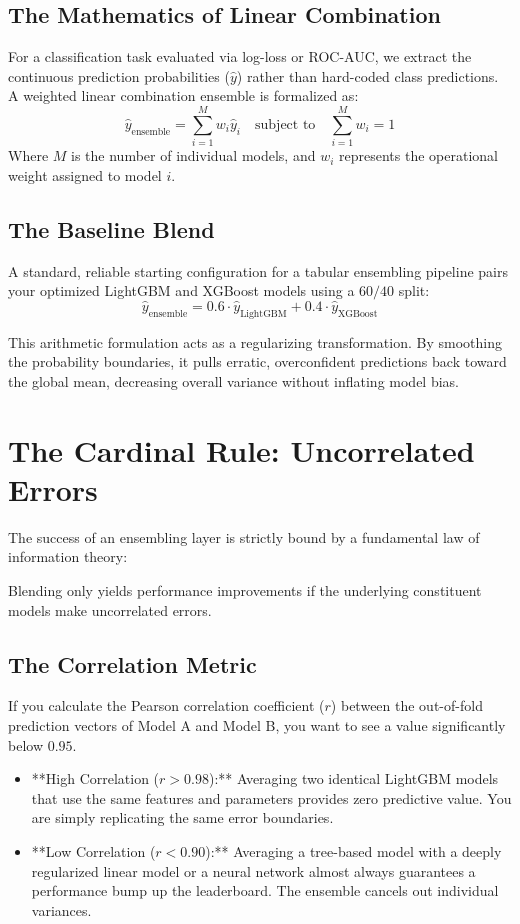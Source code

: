 \documentclass{article}
\begin{document}
\subsection{The Mathematics of Linear Combination}
For a classification task evaluated via log-loss or ROC-AUC, we extract the continuous prediction probabilities ($\hat{y}$) rather than hard-coded class predictions. A weighted linear combination ensemble is formalized as:
\begin{equation}
    \hat{y}_{\text{ensemble}} = \sum_{i=1}^{M} w_i \hat{y}_i \quad \text{subject to} \quad \sum_{i=1}^{M} w_i = 1
\end{equation}
Where $M$ is the number of individual models, and $w_i$ represents the operational weight assigned to model $i$.

\subsection{The Baseline Blend}
A standard, reliable starting configuration for a tabular ensembling pipeline pairs your optimized LightGBM and XGBoost models using a $60/40$ split:
$$\hat{y}_{\text{ensemble}} = 0.6 \cdot \hat{y}_{\text{LightGBM}} + 0.4 \cdot \hat{y}_{\text{XGBoost}}$$

This arithmetic formulation acts as a regularizing transformation. By smoothing the probability boundaries, it pulls erratic, overconfident predictions back toward the global mean, decreasing overall variance without inflating model bias.

\section{The Cardinal Rule: Uncorrelated Errors}
The success of an ensembling layer is strictly bound by a fundamental law of information theory:

\begin{tcolorbox}[colback=green!5 White,colframe=green!70!black,title=The Diversity Commandment]
Blending only yields performance improvements if the underlying constituent models make uncorrelated errors.
\end{tcolorbox}

\subsection{The Correlation Metric}
If you calculate the Pearson correlation coefficient ($r$) between the out-of-fold prediction vectors of Model A and Model B, you want to see a value significantly below $0.95$.
\begin{itemize}
    \item **High Correlation ($r > 0.98$):** Averaging two identical LightGBM models that use the same features and parameters provides zero predictive value. You are simply replicating the same error boundaries.
    \item **Low Correlation ($r < 0.90$):** Averaging a tree-based model with a deeply regularized linear model or a neural network almost always guarantees a performance bump up the leaderboard. The ensemble cancels out individual variances.
\end{itemize}
\end{document}
